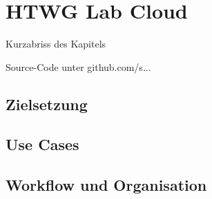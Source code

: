 


\newcommand{\thema}{HTWG Lab Cloud mit OpenStack}
\newcommand{\zusammenfassung}{Hier kommt eine kurze Zusammenfassung der Arbeit}

\newcommand{\ausgabedatum}{}
\newcommand{\abgabedatum}{}
\newcommand{\autor}{Dennis Parlak, Simon Kessler, Tobias Keh, Marco Grupe}
\newcommand{\autorStrasse}{}
\newcommand{\autorPLZ}{}
\newcommand{\autorOrt}{}
\newcommand{\autorGeburtsort}{}
\newcommand{\autorGeburtsdatum}{}
\newcommand{\prueferA}{Prof. Dr. Hanno Langweg}
\newcommand{\prueferB}{}
\newcommand{\firma}{}
\newcommand{\studiengang}{MSI Informatik}

\raggedbottom

\frontmatter


\setcounter{tocdepth}{1}
\tableofcontents 
\listoffigures
\listoftables
%
\mainmatter
{}
		



\chapter{HTWG Lab Cloud}

Kurzabriss des Kapitels

Source-Code unter github.com/s...


\section{Zielsetzung}

\section{Use Cases}

\section{Workflow und Organisation}

